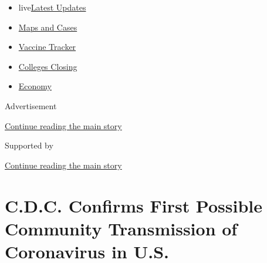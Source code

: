 \begin{itemize}
\tightlist
\item
  live\href{https://www.nytimes3xbfgragh.onion/2020/08/21/world/covid-19-coronavirus.html?name=styln-coronavirus-national\&region=TOP_BANNER\&variant=undefined\&block=storyline_menu_recirc\&action=click\&pgtype=Article\&impression_id=ad158fe1-e3a2-11ea-87e8-83b655896aaa}{Latest
  Updates}
\item
  \href{https://www.nytimes3xbfgragh.onion/interactive/2020/us/coronavirus-us-cases.html?name=styln-coronavirus-national\&region=TOP_BANNER\&variant=undefined\&block=storyline_menu_recirc\&action=click\&pgtype=Article\&impression_id=ad15b6f0-e3a2-11ea-87e8-83b655896aaa}{Maps
  and Cases}
\item
  \href{https://www.nytimes3xbfgragh.onion/interactive/2020/science/coronavirus-vaccine-tracker.html?name=styln-coronavirus-national\&region=TOP_BANNER\&variant=undefined\&block=storyline_menu_recirc\&action=click\&pgtype=Article\&impression_id=ad15b6f1-e3a2-11ea-87e8-83b655896aaa}{Vaccine
  Tracker}
\item
  \href{https://www.nytimes3xbfgragh.onion/2020/08/19/us/colleges-closing-covid.html?name=styln-coronavirus-national\&region=TOP_BANNER\&variant=undefined\&block=storyline_menu_recirc\&action=click\&pgtype=Article\&impression_id=ad15b6f2-e3a2-11ea-87e8-83b655896aaa}{Colleges
  Closing}
\item
  \href{https://www.nytimes3xbfgragh.onion/live/2020/08/20/business/stock-market-today-coronavirus?name=styln-coronavirus-national\&region=TOP_BANNER\&variant=undefined\&block=storyline_menu_recirc\&action=click\&pgtype=Article\&impression_id=ad15b6f3-e3a2-11ea-87e8-83b655896aaa}{Economy}
\end{itemize}

Advertisement

\protect\hyperlink{after-top}{Continue reading the main story}

Supported by

\protect\hyperlink{after-sponsor}{Continue reading the main story}

\hypertarget{cdc-confirms-first-possible-community-transmission-of-coronavirus-in-us}{%
\section{C.D.C. Confirms First Possible Community Transmission of
Coronavirus in
U.S.}\label{cdc-confirms-first-possible-community-transmission-of-coronavirus-in-us}}


